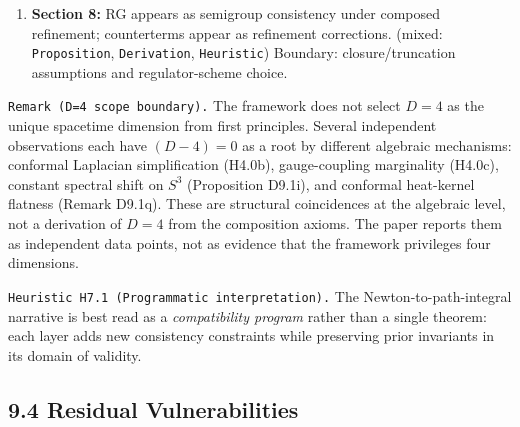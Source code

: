 \documentclass[
]{article}
\begin{document}
\begin{enumerate}
  \texttt{Remark\ P5.2a}). On curved manifolds, the half-density
  conjugation additionally modifies the connection via a drift term,
  producing the DeWitt curvature coupling \(R/6\) at each Riemann normal
  coordinate center (on general curved manifolds \(V_{\mathrm{HD}}\) is
  position-dependent; \texttt{Remark\ D9.1n}) rather than the
  Weyl/Stratonovich value \(R/8\) (\texttt{Remark\ D4.1e},
  \texttt{Remark\ D9.1p}). Crucially, the conjugation \(\Delta_{1/2}\)
  is unitarily equivalent to \(-\Delta_g\) and therefore spectrally
  identical to the bare Laplacian; the genuine ordering ambiguity lives
  in the shifted operator \(-\Delta_g + V_{\mathrm{HD}}\), which has a
  distinct spectrum (\texttt{Remark\ D9.1q}). (mixed:
  \texttt{Proposition}, \texttt{Derivation}, \texttt{Heuristic})
  Boundary: formal/asymptotic deformation setting and scope of
  equivalence; curved-manifold scope for connection-level differences.
\item
  \textbf{Section 8:} RG appears as semigroup consistency under composed
  refinement; counterterms appear as refinement corrections. (mixed:
  \texttt{Proposition}, \texttt{Derivation}, \texttt{Heuristic})
  Boundary: closure/truncation assumptions and regulator-scheme choice.
\end{enumerate}

\texttt{Remark\ (D=4\ scope\ boundary).} The framework does not select
\(D=4\) as the unique spacetime dimension from first principles. Several
independent observations each have \((D{-}4)=0\) as a root by different
algebraic mechanisms: conformal Laplacian simplification (H4.0b),
gauge-coupling marginality (H4.0c), constant spectral shift on \(S^3\)
(Proposition D9.1i), and conformal heat-kernel flatness (Remark D9.1q).
These are structural coincidences at the algebraic level, not a
derivation of \(D=4\) from the composition axioms. The paper reports
them as independent data points, not as evidence that the framework
privileges four dimensions.

\texttt{Heuristic\ H7.1\ (Programmatic\ interpretation).} The
Newton-to-path-integral narrative is best read as a \emph{compatibility
program} rather than a single theorem: each layer adds new consistency
constraints while preserving prior invariants in its domain of validity.

\hypertarget{residual-vulnerabilities}{%
\subsection{9.4 Residual
Vulnerabilities}\label{residual-vulnerabilities}}
\end{document}
